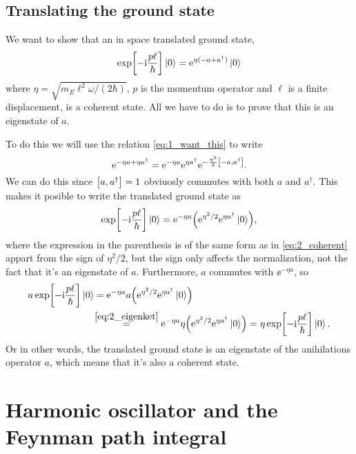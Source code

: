 \documentclass[11pt,letter, swedish, english
]{article}
\begin{document}
\subsection{Translating the ground state}
We want to show that an in space translated ground state,
\begin{equation}
\exp[-\mathrm{i}\frac{p\ell}{\hbar}]\ket{0}=\mathrm{e}^{\eta(-a+a^\dagger)}\ket{0}
\end{equation}
where $\eta=\sqrt{m_E\ell^2\omega/(2\hbar)}$, $p$ is the momentum
operator and $\ell$ is a finite displacement, is a coherent state. All
we have to do is to prove that this is an eigenstate of $a$.

To do this we will use the relation \eqref{eq:1_want_this} to write
\begin{equation}
\ee^{-\eta a + \eta a^\dagger}=\ee^{-\eta a}\ee^{\eta a^\dagger}
\ee^{-\frac{\eta^2}{2}\comm{-a}{a^\dagger}}.
\end{equation}
We can do this since $\comm{a}{a^\dagger}=1$ obviuosly commutes with
both $a$ and $a^\dagger$. This makes it posible to write the
translated ground state as
\begin{equation}
\exp[-\mathrm{i}\frac{p\ell}{\hbar}]\ket{0}
=\mathrm{e}^{-\eta a}\qty(\mathrm{e}^{\eta^2/2}\mathrm{e}^{\eta a^\dagger}\ket{0}),
\end{equation}
where the expression in the parenthesis is of the same form as in
\eqref{eq:2_coherent} appart from the sign of $\eta^2/2$, but the sign
only affects the normalization, not the fact that it's an eigenstate
of $a$. Furthermore, $a$ commutes with $\ee^{-\eta a}$, so 
\begin{equation}
\begin{aligned}
a\exp[-\mathrm{i}\frac{p\ell}{\hbar}]\ket{0}&=
\mathrm{e}^{-\eta a}a\qty(\mathrm{e}^{\eta^2/2}\mathrm{e}^{\eta a^\dagger}\ket{0})\\
&\hspace{-2pt}\stackrel{\eqref{eq:2_eigenket}}{=}
\mathrm{e}^{-\eta a}\eta\qty(\mathrm{e}^{\eta^2/2}\mathrm{e}^{\eta a^\dagger}\ket{0})
=\eta\exp[-\mathrm{i}\frac{p\ell}{\hbar}]\ket{0}.
\end{aligned}
\end{equation}
Or in other words, the translated ground state is an eigenstate of the
anihilations operator $a$, which means that it's also a coherent
state. 



\section{Harmonic oscillator and the Feynman path integral}
\end{document}
